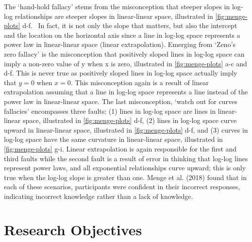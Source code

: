 \documentclass[print]{nuthesis}
\begin{document}
The `hand-hold fallacy' stems from the misconception that steeper slopes in log-log relationships are steeper slopes in linear-linear space, illustrated in \cref{fig:menge-plots} d-f.~
In fact, it is not only the slope that matters, but also the intercept and the location on the horizontal axis since a line in log-log space represents a power law in linear-linear space (linear extrapolation).
Emerging from `Zeno's zero fallacy' is the misconception that positively sloped lines in log-log space can imply a non-zero value of y when x is zero, illustrated in \cref{fig:menge-plots} a-c and d-f.
This is never true as positively sloped lines in log-log space actually imply that \(y = 0\) when \(x = 0\). This misconception again is a result of linear extrapolation assuming that a line in log-log space represents a line instead of the power law in linear-linear space.
The last misconception, `watch out for curves fallacies' encompasses three faults: (1) lines in log-log space are lines in linear-linear space, illustrated in \cref{fig:menge-plots} d-f, (2) lines in log-log space curve upward in linear-linear space, illustrated in \cref{fig:menge-plots} d-f, and (3) curves in log-log space have the same curvature in linear-linear space, illustrated in \cref{fig:menge-plots} g-i.
Linear extrapolation is again responsible for the first and third faults while the second fault is a result of error in thinking that log-log lines represent power laws, and all exponential relationships curve upward; this is only true when the log-log slope is greater than one.
Menge et al. (2018) found that in each of these scenarios, participants were confident in their incorrect responses, indicating incorrect knowledge rather than a lack of knowledge.

\hypertarget{research-objectives}{%
\section{Research Objectives}\label{research-objectives}}
\end{document}
